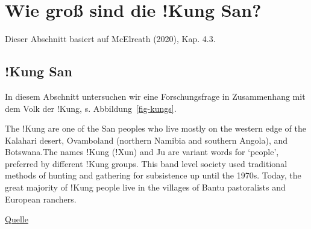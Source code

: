 \documentclass[
  a4paper,
  DIV=11]{scrreprt}
\theoremstyle{definition}
\theoremstyle{remark}
\begin{document}
\hypertarget{wie-grouxdf-sind-die-kung-san}{%
\section{Wie groß sind die !Kung
San?}\label{wie-grouxdf-sind-die-kung-san}}

Dieser Abschnitt basiert auf McElreath (2020), Kap. 4.3.

\hypertarget{kung-san}{%
\subsection{!Kung San}\label{kung-san}}

In diesem Abschnitt untersuchen wir eine Forschungsfrage in Zusammenhang
mit dem Volk der !Kung, s. Abbildung~\ref{fig-kungs}.

The ǃKung are one of the San peoples who live mostly on the western edge
of the Kalahari desert, Ovamboland (northern Namibia and southern
Angola), and Botswana.The names ǃKung (ǃXun) and Ju are variant words
for `people', preferred by different ǃKung groups. This band level
society used traditional methods of hunting and gathering for
subsistence up until the 1970s. Today, the great majority of ǃKung
people live in the villages of Bantu pastoralists and European ranchers.

\href{https://en.wikipedia.org/wiki/\%C7\%83Kung_people}{Quelle}
\end{document}
